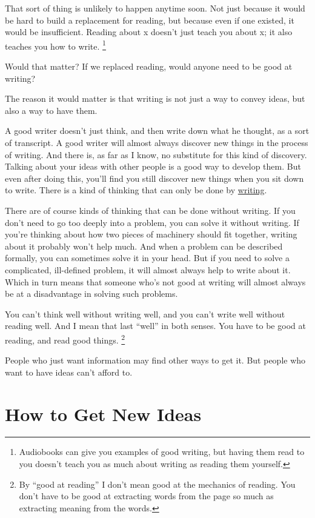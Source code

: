\documentclass[12pt]{book}
\begin{document}
That sort of thing is unlikely to happen anytime soon. Not just because
it would be hard to build a replacement for reading, but because even if
one existed, it would be insufficient. Reading about x doesn't just
teach you about x; it also teaches you how to write.
\footnote{Audiobooks can give you examples of good writing, but having
them read to you doesn't teach you as much about writing as reading them
yourself.}

Would that matter? If we replaced reading, would anyone need to be good
at writing?

The reason it would matter is that writing is not just a way to convey
ideas, but also a way to have them.

A good writer doesn't just think, and then write down what he thought,
as a sort of transcript. A good writer will almost always discover new
things in the process of writing. And there is, as far as I know, no
substitute for this kind of discovery. Talking about your ideas with
other people is a good way to develop them. But even after doing this,
you'll find you still discover new things when you sit down to write.
There is a kind of thinking that can only be done by
\href{words.html}{writing}.

There are of course kinds of thinking that can be done without writing.
If you don't need to go too deeply into a problem, you can solve it
without writing. If you're thinking about how two pieces of machinery
should fit together, writing about it probably won't help much. And when
a problem can be described formally, you can sometimes solve it in your
head. But if you need to solve a complicated, ill-defined problem, it
will almost always help to write about it. Which in turn means that
someone who's not good at writing will almost always be at a
disadvantage in solving such problems.

You can't think well without writing well, and you can't write well
without reading well. And I mean that last ``well'' in both senses. You
have to be good at reading, and read good things.
\footnote{By ``good at reading'' I don't mean good at the mechanics of
reading. You don't have to be good at extracting words from the page so
much as extracting meaning from the words.}

People who just want information may find other ways to get it. But
people who want to have ideas can't afford to.
\chapter{How to Get New Ideas}
\end{document}
